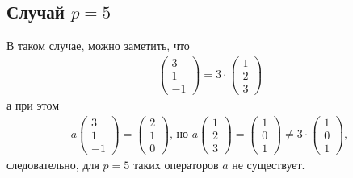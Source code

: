 \subsection{Случай $p = 5$}
В таком случае, можно заметить, что 
\begin{gather}
    \begin{pmatrix}
        3 \\ 1 \\ -1
    \end{pmatrix} = 3 \cdot
    \begin{pmatrix}
        1 \\ 2 \\ 3
    \end{pmatrix}
\end{gather}
а при этом
\begin{gather}
    a\begin{pmatrix}
        3 \\ 1 \\ -1
    \end{pmatrix} = 
    \begin{pmatrix}
        2 \\ 1 \\0
    \end{pmatrix}\text{, но }
    a\begin{pmatrix}
        1 \\ 2 \\ 3
    \end{pmatrix} = 
    \begin{pmatrix}
        1 \\ 0 \\ 1
    \end{pmatrix} \neq 3\cdot
    \begin{pmatrix}
        1 \\ 0 \\ 1
    \end{pmatrix},
\end{gather}
следовательно, для $p = 5$ таких операторов $a$ не существует.

